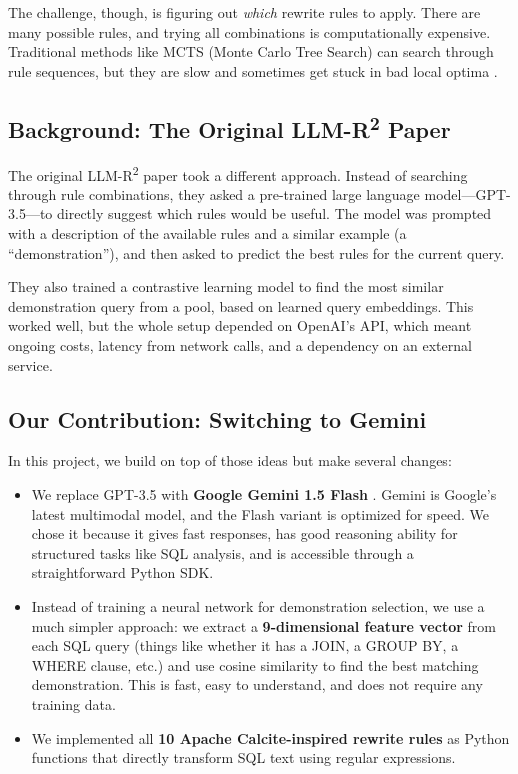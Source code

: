 \documentclass[12pt,a4paper]{article}
\begin{document}
The challenge, though, is figuring out \textit{which} rewrite rules to apply. There are many possible rules, and trying all combinations is computationally expensive. Traditional methods like MCTS (Monte Carlo Tree Search) can search through rule sequences, but they are slow and sometimes get stuck in bad local optima \cite{llmr2}.

\subsection{Background: The Original LLM-R\textsuperscript{2} Paper}

The original LLM-R\textsuperscript{2} paper \cite{llmr2} took a different approach. Instead of searching through rule combinations, they asked a pre-trained large language model---GPT-3.5---to directly suggest which rules would be useful. The model was prompted with a description of the available rules and a similar example (a ``demonstration''), and then asked to predict the best rules for the current query.

They also trained a contrastive learning model to find the most similar demonstration query from a pool, based on learned query embeddings. This worked well, but the whole setup depended on OpenAI's API, which meant ongoing costs, latency from network calls, and a dependency on an external service.

\subsection{Our Contribution: Switching to Gemini}

In this project, we build on top of those ideas but make several changes:

\begin{itemize}[leftmargin=*]
    \item We replace GPT-3.5 with \textbf{Google Gemini 1.5 Flash} \cite{gemini15}. Gemini is Google's latest multimodal model, and the Flash variant is optimized for speed. We chose it because it gives fast responses, has good reasoning ability for structured tasks like SQL analysis, and is accessible through a straightforward Python SDK.

    \item Instead of training a neural network for demonstration selection, we use a much simpler approach: we extract a \textbf{9-dimensional feature vector} from each SQL query (things like whether it has a JOIN, a GROUP BY, a WHERE clause, etc.) and use cosine similarity to find the best matching demonstration. This is fast, easy to understand, and does not require any training data.

    \item We implemented all \textbf{10 Apache Calcite-inspired rewrite rules} \cite{calcite} as Python functions that directly transform SQL text using regular expressions.
\end{itemize}
\end{document}
